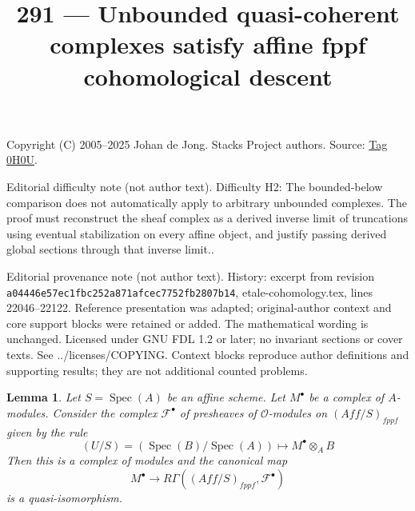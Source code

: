 \documentclass{amsart}
\theoremstyle{plain}
\newtheorem{lemma}[subsection]{Lemma}
\theoremstyle{definition}
\theoremstyle{remark}
\numberwithin{equation}{subsection}
\def\Spec{\mathop{\mathrm{Spec}}}
\begin{document}
\title[Stacks Project, Tag 0H0U]{291 --- Unbounded quasi-coherent complexes satisfy affine fppf cohomological descent}
\maketitle
\noindent Copyright (C) 2005--2025 Johan de Jong. Stacks Project authors. Source: \href{https://stacks.math.columbia.edu/tag/0H0U}{Tag 0H0U}.

\noindent Editorial difficulty note (not author text). Difficulty H2: The bounded-below comparison does not automatically apply to arbitrary unbounded complexes. The proof must reconstruct the sheaf complex as a derived inverse limit of truncations using eventual stabilization on every affine object, and justify passing derived global sections through that inverse limit..

\noindent Editorial provenance note (not author text). History: excerpt from revision \texttt{a0444\allowbreak 6e57e\allowbreak c1fbc\allowbreak 252a8\allowbreak 71afc\allowbreak ec775\allowbreak 2fb28\allowbreak 07b14}, etale-cohomology.tex, lines 22046--22122. Reference presentation was adapted; original-author context and core support blocks were retained or added. The mathematical wording is unchanged. Licensed under GNU FDL 1.2 or later; no invariant sections or cover texts. See ../licenses/COPYING. Context blocks reproduce author definitions and supporting results; they are not additional counted problems.

\begin{lemma}
\label{lemma-cohomological-descent-complex-modules}
Let $S = \Spec(A)$ be an affine scheme. Let $M^\bullet$ be a complex
of $A$-modules. Consider the complex $\mathcal{F}^\bullet$ of
presheaves of $\mathcal{O}$-modules on
$(\textit{Aff}/S)_{fppf}$ given by the rule
$$
(U/S) = (\Spec(B)/\Spec(A)) \longmapsto M^\bullet \otimes_A B
$$
Then this is a complex of modules and the canonical map
$$
M^\bullet \longrightarrow
R\Gamma((\textit{Aff}/S)_{fppf}, \mathcal{F}^\bullet)
$$
is a quasi-isomorphism.
\end{lemma}
\end{document}
